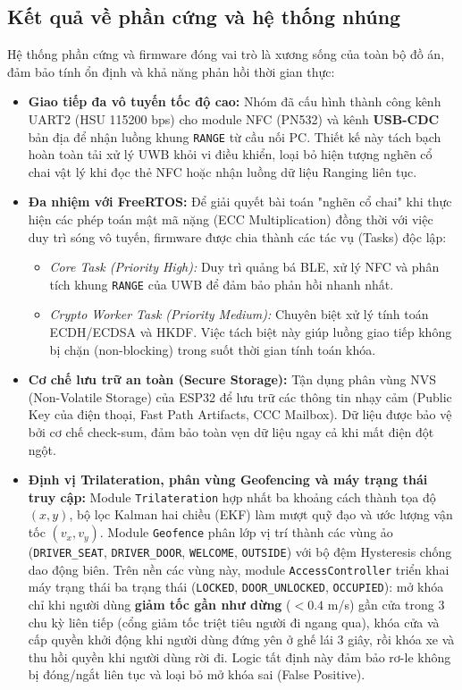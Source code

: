 \subsection{Kết quả về phần cứng và hệ thống nhúng}

Hệ thống phần cứng và firmware đóng vai trò là xương sống của toàn bộ đồ án, đảm bảo tính ổn định và khả năng phản hồi thời gian thực:

\begin{itemize}
    \item \textbf{Giao tiếp đa vô tuyến tốc độ cao:} Nhóm đã cấu hình thành công kênh UART2 (HSU 115200 bps) cho module NFC (PN532) và kênh \textbf{USB-CDC} bản địa để nhận luồng khung \texttt{RANGE} từ cầu nối PC. Thiết kế này tách bạch hoàn toàn tải xử lý UWB khỏi vi điều khiển, loại bỏ hiện tượng nghẽn cổ chai vật lý khi đọc thẻ NFC hoặc nhận luồng dữ liệu Ranging liên tục.
    \item \textbf{Đa nhiệm với FreeRTOS:} Để giải quyết bài toán "nghẽn cổ chai" khi thực hiện các phép toán mật mã nặng (ECC Multiplication) đồng thời với việc duy trì sóng vô tuyến, firmware được chia thành các tác vụ (Tasks) độc lập:
    \begin{itemize}
        \item \textit{Core Task (Priority High):} Duy trì quảng bá BLE, xử lý NFC và phân tích khung \texttt{RANGE} của UWB để đảm bảo phản hồi nhanh nhất.
        \item \textit{Crypto Worker Task (Priority Medium):} Chuyên biệt xử lý tính toán ECDH/ECDSA và HKDF. Việc tách biệt này giúp luồng giao tiếp không bị chặn (non-blocking) trong suốt thời gian tính toán khóa.
    \end{itemize}
    \item \textbf{Cơ chế lưu trữ an toàn (Secure Storage):} Tận dụng phân vùng NVS (Non-Volatile Storage) của ESP32 để lưu trữ các thông tin nhạy cảm (Public Key của điện thoại, Fast Path Artifacts, CCC Mailbox). Dữ liệu được bảo vệ bởi cơ chế check-sum, đảm bảo toàn vẹn dữ liệu ngay cả khi mất điện đột ngột.
    \item \textbf{Định vị Trilateration, phân vùng Geofencing và máy trạng thái truy cập:} Module \texttt{Trilateration} hợp nhất ba khoảng cách thành tọa độ $(x, y)$, bộ lọc Kalman hai chiều (EKF) làm mượt quỹ đạo và ước lượng vận tốc $(v_x, v_y)$. Module \texttt{Geofence} phân lớp vị trí thành các vùng ảo (\texttt{DRIVER\_SEAT}, \texttt{DRIVER\_DOOR}, \texttt{WELCOME}, \texttt{OUTSIDE}) với bộ đệm Hysteresis chống dao động biên. Trên nền các vùng này, module \texttt{AccessController} triển khai máy trạng thái ba trạng thái (\texttt{LOCKED}, \texttt{DOOR\_UNLOCKED}, \texttt{OCCUPIED}): mở khóa chỉ khi người dùng \textbf{giảm tốc gần như dừng} ($<0.4$ m/s) gần cửa trong 3 chu kỳ liên tiếp (cổng giảm tốc triệt tiêu người đi ngang qua), khóa cửa và cấp quyền khởi động khi người dùng đứng yên ở ghế lái 3 giây, rồi khóa xe và thu hồi quyền khi người dùng rời đi. Logic tất định này đảm bảo rơ-le không bị đóng/ngắt liên tục và loại bỏ mở khóa sai (False Positive).
\end{itemize}

